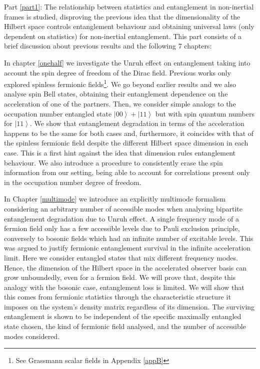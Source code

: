 \begin{list}{}{\leftmargin=1em}
\item  Part \ref{part1}: The relationship between statistics and entanglement in non-inertial frames is studied, disproving the previous idea that the dimensionality of the Hilbert  space controls entanglement behaviour and  obtaining universal laws (only dependent on statistics) for non-inertial entanglement. This part consists of a brief discussion about previous results and the following 7 chapters:
\begin{list}{}{\leftmargin=1em}
\item In chapter \ref{onehalf} we investigate the Unruh effect on entanglement taking into account the spin degree of freedom of the Dirac field. Previous works only explored spinless fermionic fields\footnote{See Grassmann scalar fields in Appendix \ref{appB}}. We go beyond earlier results and we also  analyse spin Bell states, obtaining their entanglement dependence on the acceleration of one of the partners. Then, we consider simple analogs to the occupation number entangled state $\left|00\right\rangle+\left|11\right\rangle$ but with spin quantum numbers for $\left|11\right\rangle$. We show that entanglement degradation in terms of the acceleration happens to be the same for both cases and, furthermore, it coincides with that of the spinless fermionic field despite the different Hilbert space dimension in each case. This is a  first hint against the idea that dimension rules entanglement behaviour. We also introduce a procedure to consistently erase the spin information from our setting, being able to account for correlations present only in the occupation number degree of freedom.  
\item In Chapter \ref{multimode} we introduce an explicitly multimode formalism considering an arbitrary number of accessible modes when analysing bipartite entanglement degradation due to Unruh effect.  A single frequency mode of a fermion field only has a few accessible levels due to Pauli exclusion principle, conversely to bosonic fields which had an infinite number of excitable levels. This was argued to justify fermionic entanglement survival in the infinite acceleration limit. Here we consider entangled states that mix different frequency modes. Hence, the dimension of the Hilbert space in the accelerated observer basis can grow unboundedly, even for a fermion field. We will prove that, despite this analogy with the bosonic case, entanglement loss is limited. We will show that this comes from fermionic statistics through the characteristic structure it imposes on the system's density matrix regardless of its dimension. The surviving entanglement is shown to be independent of the specific maximally entangled state chosen, the kind of fermionic field analysed, and the number of accessible modes considered.

\end{list}
\end{list}

